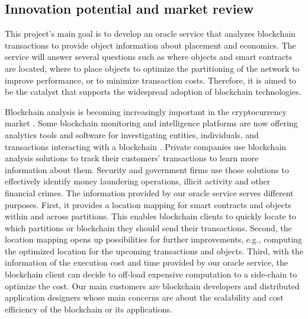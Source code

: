 \subsection{Innovation potential and market review} 

This project's main goal is to develop an oracle service that analyzes
blockchain transactions to provide object information about placement and
economics. The service will answer several questions such as where objects and
smart contracts are located, where to place objects to optimize the partitioning
of the network to improve performance, or to minimize transaction costs.
Therefore, it is aimed to be the catalyst that supports the widespread adoption
of blockchain technologies.

Blockchain analysis is becoming increasingly important in the
cryptocurrency market \cite{blockchainanalysis}. Some blockchain monitoring and
intelligence platforms are now offering analytics tools and software for
investigating entities, individuals, and transactions interacting with a
blockchain \cite{chainalysis2020kyt, bloxy, blocmonitor}. Private companies use
blockchain analysis solutions to track their customers' transactions to learn more
information about them. Security and government firms use those solutions to
effectively identify money laundering operations, illicit activity and other
financial crimes. The information provided by our oracle service serves
different purposes. First, it provides a location mapping for smart contracts
and objects within and across partitions. This enables blockchain clients to
quickly locate to which partitions or blockchain they should send their
transactions. Second, the location mapping opens up possibilities for further
improvements, e.g., computing the optimized location for the upcoming
transactions and objects. Third, with the information of the execution cost and
time provided by our oracle service, the blockchain client can decide to
off-load expensive computation to a side-chain to optimize the cost. Our
main customers are blockchain developers and distributed application designers
whose main concerns are about the scalability and cost efficiency of the
blockchain or its applications.



